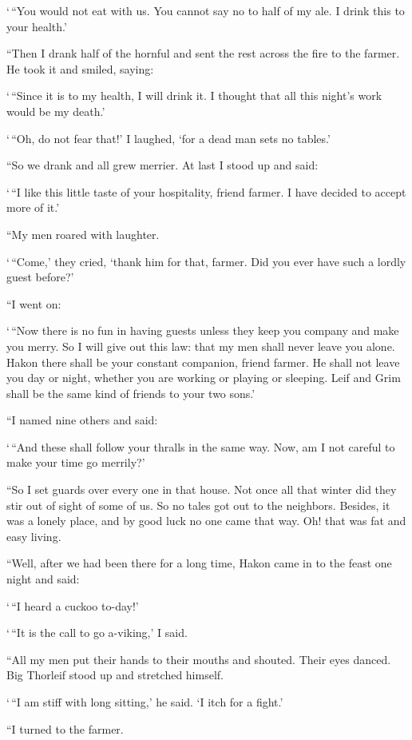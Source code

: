 `\,``You would not eat with us. You cannot say no to half of my ale. I
drink this to your health.'

``Then I drank half of the hornful and sent the rest across the fire to
the farmer. He took it and smiled, saying:

`\,``Since it is to my health, I will drink it. I thought that all this
night's work would be my death.'

`\,``Oh, do not fear that!' I laughed, `for a dead man sets no tables.'

``So we drank and all grew merrier. At last I stood up and said:

`\,``I like this little taste of your hospitality, friend farmer. I have
decided to accept more of it.'

``My men roared with laughter.

`\,``Come,' they cried, `thank him for that, farmer. Did you ever have such
a lordly guest before?'

``I went on:

`\,``Now there is no fun in having guests unless they keep you company and
make you merry. So I will give out this law: that my men shall never
leave you alone. Hakon there shall be your constant companion, friend
farmer. He shall not leave you day or night, whether you are working or
playing or sleeping. Leif and Grim shall be the same kind of friends to
your two sons.'

``I named nine others and said:

`\,``And these shall follow your thralls in the same way. Now, am I not
careful to make your time go merrily?'

``So I set guards over every one in that house. Not once all that winter
did they stir out of sight of some of us. So no tales got out to the
neighbors. Besides, it was a lonely place, and by good luck no one came
that way. Oh! that was fat and easy living.

``Well, after we had been there for a long time, Hakon came in to the
feast one night and said:

`\,``I heard a cuckoo to-day!'

`\,``It is the call to go a-viking,' I said.

``All my men put their hands to their mouths and shouted. Their eyes
danced. Big Thorleif stood up and stretched himself.

`\,``I am stiff with long sitting,' he said. `I itch for a fight.'

``I turned to the farmer.

